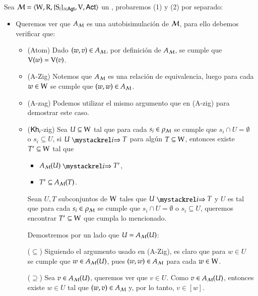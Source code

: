 \begin{demostracion}
    Sea $\mathcal{M}=\langle \mathrm{W},\mathrm{R},\{ \mathrm{S}_i \}_{i \in {\rm \sf Agt}},\mathrm{V},{\rm \sf Act} \rangle$ un \ults, probaremos (1) y (2) por separado:

    \begin{itemize}
        \item Queremos ver que $A_{\mathcal{M}}$ es una autobisimulación de $\mathcal{M}$, para ello debemos verificar que:
        \begin{itemize}
            \item (Atom) Dado $(w,v) \in A_{\mathcal{M}}$, por definición de $A_{\mathcal{M}}$, se cumple que $\mathrm{V}(w) = \mathrm{V}(v)$.
            \item (A-Zig) Notemos que $A_{\mathcal{M}}$ es una relación de equivalencia, luego para cada $w\in \mathrm{W}$ se cumple que $(w,w) \in A_{\mathcal{M}}$.
            \item (A-zag) Podemos utilizar el mismo argumento que en (A-zig) para demostrar este caso.
            \item ($\mathsf{Kh}_i$-zig) Sea $U \subseteq \mathrm{W}$ tal que para cada $s_i \in \rho_{\mathcal{M}}$ se cumple que $s_i \cap U = \emptyset$ o 
            $s_i \subseteq U$, si $U \ultsExecAgi T$ para algún $T \subseteq \mathrm{W}$, entonces existe $T' \subseteq \mathrm{W}$ tal que
                \begin{multicols}{2}
                    \begin{itemize}
                        \item $A_\modults(U) \ultsExecAgi T'$, 
                        \item $T' \subseteq A_{\mathcal{M}}(T)$.
                    \end{itemize}
                \end{multicols}

            Sean $U,T$ subconjuntos de $\mathrm{W}$ tales que $U \ultsExecAgi T$ y $U$ es tal que para cada $s_i \in \rho_{\mathcal{M}}$ se cumple que 
            $s_i \cap U = \emptyset$ o $s_i \subseteq U$, queremos encontrar $T' \subseteq \mathrm{W}$ que cumpla lo mencionado.
            
            Demostremos por un lado que $U = A_{\mathcal{M}}(U)$:
            
            ($\subseteq$) Siguiendo el argumento usado en (A-Zig), es claro que para $w \in U$ se cumple que $w \in A_{\mathcal{M}}(U)$, pues $(w,w) \in A_{\mathcal{M}}$ para cada $w \in \mathrm{W}$. 
            
            ($\supseteq$) Sea $v \in A_{\mathcal{M}}(U)$, queremos ver que $v \in U$.
            Como $v \in A_{\mathcal{M}}(U)$, entonces existe $w \in U$ tal que $(w,v) \in A_{\mathcal{M}}$ y, por lo tanto, $v \in [w]$.
            

\end{itemize}
\end{itemize}
\end{demostracion}
